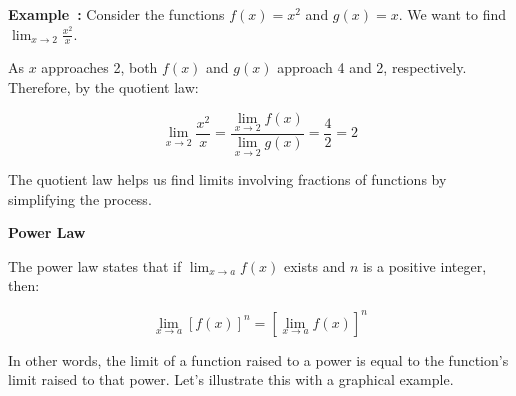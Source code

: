 \documentclass[a4paper,12pt]{book}
\newcounter{example}
\newenvironment{example}[1][\theexample]
  {\refstepcounter{example}\par\medskip\noindent\textbf{Example~#1:} \rmfamily}
  {\medskip}
\begin{document}
\begin{example}
Consider the functions \( f(x) = x^2 \) and \( g(x) = x \). We want to find \( \lim_{{x \to 2}} \frac{x^2}{x} \).

\begin{center}
\end{center}

As \( x \) approaches 2, both \( f(x) \) and \( g(x) \) approach 4 and 2, respectively. Therefore, by the quotient law:

\[
\lim_{{x \to 2}} \frac{x^2}{x} = \frac{\lim_{{x \to 2}} f(x)}{\lim_{{x \to 2}} g(x)} = \frac{4}{2} = 2
\]
\end{example}

The quotient law helps us find limits involving fractions of functions by simplifying the process.

\textbf{Power Law}

The power law states that if \( \lim_{{x \to a}} f(x) \) exists and \( n \) is a positive integer, then:

\[
\lim_{{x \to a}} [f(x)]^n = [\lim_{{x \to a}} f(x)]^n
\]

In other words, the limit of a function raised to a power is equal to the function's limit raised to that power. Let's illustrate this with a graphical example.
\end{document}
